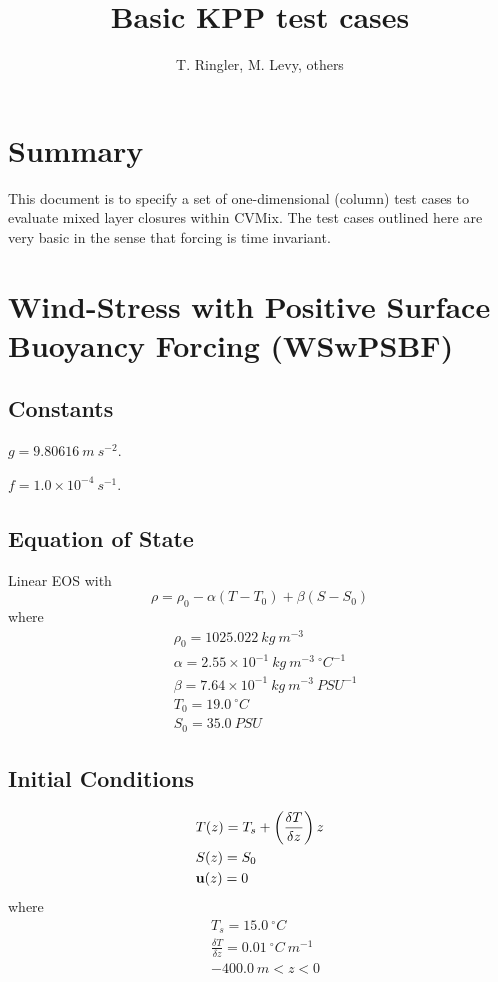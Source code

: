 \documentclass[fleqn, 12pt]{report}
\begin{document}
\title{
Basic KPP test cases}
\author{T. Ringler, M. Levy, others}

\maketitle
\tableofcontents


\chapter{Summary}
This document is to specify a set of one-dimensional (column) test cases to evaluate mixed layer closures within CVMix. The test cases outlined here are very basic in the sense that forcing is time invariant.

\chapter{Wind-Stress with Positive Surface Buoyancy Forcing (WSwPSBF)}

\section{Constants}

$g=9.80616 \ m \ s^{-2}$.

$f=1.0 \times 10^{-4} \ s^{-1}$.

\section{Equation of State}
Linear EOS with
\begin{equation}
\rho = \rho_0 - \alpha (T-T_0) + \beta (S-S_0)
\end{equation}
where 
\begin{align*}
&\rho_0=1025.022 \ kg \ m^{-3} \\
&\alpha=2.55\times10^{-1} \ kg \ m^{-3} \ ^{\circ}C^{-1} \\
&\beta=7.64\times10^{-1} \ kg \ m^{-3} \ {PSU}^{-1} \\
&T_0= 19.0 \ ^{\circ}C \\
&S_0=35.0 \ PSU 
\end{align*}

\section{Initial Conditions}

\begin{align*}
&T(z) = T_s + \left( \frac{\delta T}{\delta z} \right) z  \\
&S(z) = S_0 \\
&{\bf u}(z) = 0
\end{align*}
where
\begin{align*}
&T_s=15.0 \ ^{\circ}C \\
&\frac{\delta T}{\delta z}=0.01 \ ^{\circ}C \ m^{-1} \\
&-400.0 \ m <z<0
\end{align*}
\end{document}
